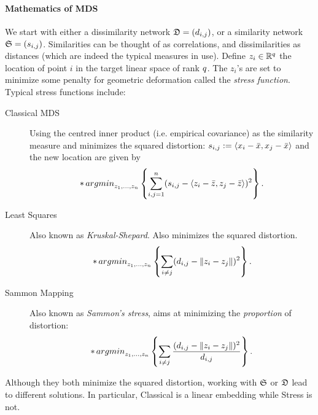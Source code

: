 \paragraph{Mathematics of MDS}
We start with either a dissimilarity network $\mathfrak{D}=(d_{i,j})$, or a similarity network $\mathfrak{S}=(s_{i,j})$.
Similarities can be thought of as correlations, and dissimilarities as distances (which are indeed the typical measures in use).
Define $z_i \in \mathbb{R}^q$ the location of point $i$ in the target linear space of rank $q$. 
The $z_i$'s are set to minimize some penalty for geometric deformation called the \emph{stress function}.
Typical stress functions include:
\begin{description}

\item[Classical MDS] Using the centred inner product (i.e. empirical covariance) as the similarity measure and minimizes the squared distortion:
$s_{i,j}:= \left< x_i-\bar x,x_j-\bar{x} \right>$ and the new location are given by
\begin{align}
\label{eq:mds_classical}
	 \mathop*{argmin} _{z_1,\dots,z_n}\left\{ \sum_{i,j=1}^{n} (s_{i,j}-\left< z_i-\bar z,z_j-\bar{z} \right> )^2 \right\}.
\end{align}

\item[Least Squares] Also known as \emph{Kruskal-Shepard}. Also minimizes the squared distortion. 
\begin{align}
\label{eq:mds_stress}
	 \mathop*{argmin} _{z_1,\dots,z_n}\left\{ \sum_{i \neq j} (d_{i,j}-\Vert z_i-z_j \Vert )^2 \right\}.
\end{align}

\item[Sammon Mapping] Also known as \emph{Sammon's stress}, aims at minimizing the \emph{proportion} of distortion:
\begin{align}
\label{eq:mds_sammon}
	 \mathop*{argmin} _{z_1,\dots,z_n}\left\{ \sum_{i \neq j} \frac{(d_{i,j}-\Vert z_i-z_j \Vert )^2}{d_{i,j}} \right\}.
\end{align}

\end{description}


\begin{remark}
Although they both minimize the squared distortion, working with $\mathfrak{S}$ or $\mathfrak{D}$ lead to different solutions. 
In particular, Classical is a linear embedding while Stress is not. 
\end{remark}




